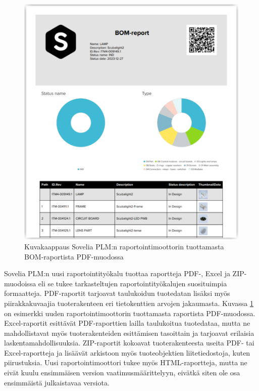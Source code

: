 \begin{figure}[h!]
\includegraphics[width=1\textwidth]{img/report.png}
\caption{Kuvakaappaus Sovelia PLM:n raportointimoottorin tuottamasta BOM-raportista PDF-muodossa\label{fig:report}}
\end{figure}

Sovelia PLM:n uusi raportointityökalu tuottaa raportteja PDF-, Excel ja ZIP-muodoissa eli se tukee tarkasteltujen raportointityökalujen suosituimpia formaatteja. PDF-raportit tarjoavat taulukoidun tuotedatan lisäksi myös piirakkakuvaajia tuoterakenteen eri tietokenttien arvojen jakaumasta. Kuvassa \ref{fig:report} on esimerkki uuden raportointimoottorin tuottamasta raportista PDF-muodossa. Excel-raportit esittävät PDF-raporttien lailla taulukoitua tuotedataa, mutta ne mahdollistavat myös tuoterakenteiden esittämisen tasoittain ja tarjoavat erilaisia laskentamahdollisuuksia. ZIP-raportit kokoavat tuoterakenteesta useita PDF- tai Excel-raportteja ja lisäävät arkistoon myös tuoteobjektien liitetiedostoja, kuten piirustuksia. Uusi raportointimoottori tukee myös HTML-raportteja, mutta ne eivät kuulu ensimmäisen version vaatimusmäärittelyyn, eivätkä siten ole osa ensimmäistä julkaistavaa versiota.

